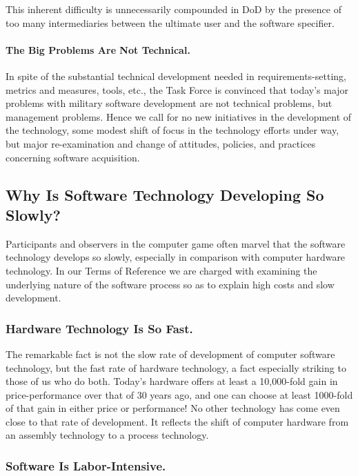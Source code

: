 \documentclass[12pt,final]{article}
\begin{document}
This inherent difficulty is unnecessarily compounded in DoD by the presence of
too many intermediaries between the ultimate user and the software specifier.

\paragraph{The Big Problems Are Not Technical.} In spite of the substantial
technical development needed in requirements-setting, metrics and measures,
tools, etc., the Task Force is convinced that today’s major problems with
military software development are not technical problems, but management
problems. Hence we call for no new initiatives in the development of the
technology, some modest shift of focus in the technology efforts under way, but
major re-examination and change of attitudes, policies, and practices
concerning software acquisition.

\subsection{Why Is Software Technology Developing So Slowly?}

Participants and observers in the computer game often marvel that the software
technology develops so slowly, especially in comparison with computer hardware
technology.  In our Terms of Reference we are charged with examining the
underlying nature of the software process so as to explain high costs and slow
development.

\subsubsection*{Hardware Technology Is So Fast.}

The remarkable fact is not the slow rate of development of computer software
technology, but the fast rate of hardware technology, a fact especially
striking to those of us who do both. Today’s hardware offers at least a
10,000-fold gain in price-performance over that of 30 years ago, and one can
choose at least 1000-fold of that gain in either price or performance! No other
technology has come even close to that rate of development. It reflects the
shift of computer hardware from an assembly technology to a process technology.

\subsubsection*{Software Is Labor-Intensive.}
\end{document}
